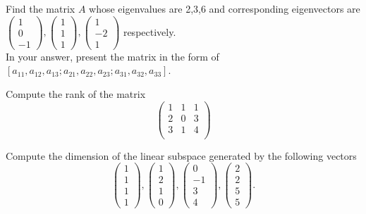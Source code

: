 \begin{problem}  Find the matrix $A$ whose eigenvalues are 2,3,6 and corresponding eigenvectors are
 $\begin{pmatrix} 1\\0 \\ -1 \end{pmatrix}, \begin{pmatrix}1\\1\\1 \end{pmatrix}, \begin{pmatrix}1\\-2\\1 \end{pmatrix}$ respectively.\\
In your answer, present the matrix in the form of $[a_{11}, a_{12}, a_{13}; a_{21}, a_{22}, a_{23}; a_{31}, a_{32}, a_{33} ]$. 
\end{problem}

\begin{problem}  Compute the rank of the matrix
 \[\left(
     \begin{array}{ccc}
       1 & 1 & 1 \\
       2 & 0 & 3 \\
       3 & 1 & 4 \\
     \end{array}
   \right)
 \]
\end{problem}

\begin{problem}
 Compute the dimension  of the linear subspace generated by the following vectors
 \[\left(\begin{array}{c}
     1 \\
     1 \\
     1 \\
    1
   \end{array}\right),\left(\begin{array}{c}
     1 \\
     2 \\
     1 \\
    0
   \end{array}\right), \left(\begin{array}{c}
     0 \\
     -1 \\
     3 \\
    4
   \end{array}\right),\left(\begin{array}{c}
     2 \\
     2 \\
     5 \\
    5
   \end{array}\right).
 \]
\end{problem}

